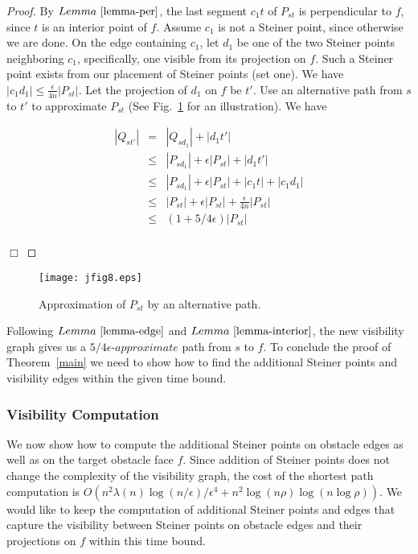 \documentclass{llncs}
\begin{document}
\begin{proof}



By $Lemma \ \ref{lemma-per}$, the last segment $c_1t$ of $P_{st}$ is perpendicular to $f$, since $t$ is an interior
point of $f$. Assume $c_1$ is not a Steiner point, since otherwise we are done.
On the edge containing $c_1$, let $d_1$ be one of the two Steiner points neighboring $c_1$,
specifically, one visible from its projection on $f$. Such a Steiner point exists from our placement of Steiner points (set one). We have $|c_1d_1| \leq \frac{\epsilon}{4n}|P_{st}|$.
Let the projection of $d_1$ on $f$ be $t'$. Use an alternative path from $s$ to $t'$ to approximate $P_{st}$ (See Fig.~\ref{jfig8} for an illustration). We have


\begin{eqnarray*}
|Q_{st'}| &=& |Q_{sd_1}| + |d_1t'| \\
            &\leq& |P_{sd_1}| + \epsilon |P_{st}| + |d_1t'|\\
            &\leq& |P_{sd_1}| + \epsilon |P_{st}| + |c_1t| + |c_1d_1|\\
            &\leq& |P_{st}|+\epsilon |P_{st}|+\frac{\epsilon}{4n}|P_{st}|\\
            &\leq& (1+5/4\epsilon) |P_{st}| \\
\end{eqnarray*}

\hfill $\Box$
\end{proof}

\begin{figure}\begin{center}
    \leavevmode
\texttt{[image: jfig8.eps]}
    \caption{Approximation of $P_{st}$ by an alternative path.}
    \label{jfig8}
    \end{center}
\end{figure}


Following $Lemma~\ref{lemma-edge}$ and $Lemma~\ref{lemma-interior}$, the new visibility graph gives us a
$5/4\epsilon$-$approximate$ path from $s$ to $f$.
To conclude the proof of Theorem~\ref{main} we need to show how to find the additional Steiner points
and visibility edges within the given time bound.

\subsubsection{Visibility Computation}

We now show how to compute the additional Steiner points on obstacle edges as well as on the target obstacle face $f$. Since addition of Steiner points does not change the complexity of the visibility graph, the cost of the shortest path computation is $O(n^2\lambda(n)\log(n/\epsilon)/{\epsilon}^4+n^2\log(n\rho)\log(n\log\rho))$.
We would like to keep the computation of additional Steiner points and edges that capture
the visibility between Steiner points on obstacle edges and their projections on $f$ within this time bound.
\end{document}
